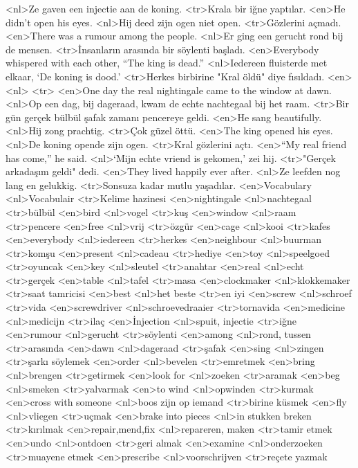<nl>Ze gaven een injectie aan de koning.
<tr>Krala bir iğne yaptılar.
<en>He didn’t open his eyes.
<nl>Hij deed zijn ogen niet open.
<tr>Gözlerini açmadı.
<en>There was a rumour among the people.
<nl>Er ging een gerucht rond bij de mensen.
<tr>İnsanların arasında bir söylenti başladı.
<en>Everybody whispered with each other, “The king is dead.”
<nl>Iedereen fluisterde met elkaar, `De koning is dood.'
<tr>Herkes birbirine "Kral öldü" diye fısıldadı.
<en>
<nl>
<tr>
<en>One day the real nightingale came to the window at dawn.
<nl>Op een dag, bij dageraad,  kwam de echte nachtegaal bij het raam.
<tr>Bir gün gerçek bülbül şafak zamanı pencereye geldi.
<en>He sang beautifully.
<nl>Hij zong prachtig.
<tr>Çok güzel öttü.
<en>The king opened his eyes.
<nl>De koning opende zijn ogen.
<tr>Kral gözlerini açtı.
<en>“My real friend has  come,” he said.
<nl>`Mijn echte vriend is gekomen,' zei hij.
<tr>"Gerçek arkadaşım geldi" dedi.
<en>They lived happily ever after.
<nl>Ze leefden nog lang en gelukkig.
<tr>Sonsuza kadar mutlu yaşadılar.
<en>Vocabulary
<nl>Vocabulair
<tr>Kelime hazinesi
<en>nightingale
<nl>nachtegaal
<tr>bülbül
<en>bird
<nl>vogel
<tr>kuş
<en>window
<nl>raam
<tr>pencere
<en>free
<nl>vrij
<tr>özgür
<en>cage
<nl>kooi
<tr>kafes
<en>everybody
<nl>iedereen
<tr>herkes
<en>neighbour
<nl>buurman
<tr>komşu
<en>present
<nl>cadeau
<tr>hediye
<en>toy
<nl>speelgoed
<tr>oyuncak
<en>key
<nl>sleutel
<tr>anahtar
<en>real
<nl>echt
<tr>gerçek
<en>table
<nl>tafel
<tr>masa
<en>clockmaker
<nl>klokkemaker
<tr>saat tamricisi
<en>best
<nl>het beste
<tr>en iyi
<en>screw
<nl>schroef
<tr>vida
<en>screwdriver
<nl>schroevedraaier
<tr>tornavida
<en>medicine
<nl>medicijn
<tr>ilaç
<en>İnjection
<nl>spuit, injectie
<tr>iğne
<en>rumour
<nl>gerucht
<tr>söylenti
<en>among
<nl>rond, tussen
<tr>arasında
<en>dawn
<nl>dageraad
<tr>şafak
<en>sing
<nl>zingen
<tr>şarkı söylemek
<en>order
<nl>bevelen
<tr>emretmek
<en>bring
<nl>brengen
<tr>getirmek
<en>look for
<nl>zoeken
<tr>aramak
<en>beg
<nl>smeken
<tr>yalvarmak
<en>to wind
<nl>opwinden
<tr>kurmak
<en>cross with someone
<nl>boos zijn op iemand
<tr>birine küsmek
<en>fly
<nl>vliegen
<tr>uçmak
<en>brake into pieces
<nl>in stukken breken
<tr>kırılmak
<en>repair,mend,fix
<nl>repareren, maken
<tr>tamir etmek
<en>undo
<nl>ontdoen 
<tr>geri almak
<en>examine
<nl>onderzoeken
<tr>muayene etmek
<en>prescribe
<nl>voorschrijven
<tr>reçete yazmak
